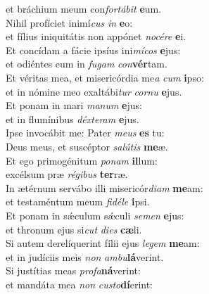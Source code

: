 \oddverse et bráchium meum con\textit{for}\textit{tá}\textit{bit} \textbf{e}um.\\
\evenverse Nihil profíciet inimí\textit{cus} \textit{in} \textbf{e}o:~\*\\
\evenverse et fílius iniquitátis non appónet \textit{no}\textit{cé}\textit{re} \textbf{e}i.\\
\oddverse Et concídam a fácie ipsíus ini\textit{mí}\textit{cos} \textbf{e}jus:~\*\\
\oddverse et odiéntes eum in \textit{fu}\textit{gam} \textit{con}\textbf{vér}tam.\\
\evenverse Et véritas mea, et misericórdia me\textit{a} \textit{cum} \textbf{i}pso:~\*\\
\evenverse et in nómine meo exaltábi\textit{tur} \textit{cor}\textit{nu} \textbf{e}jus.\\
\oddverse Et ponam in mari \textit{ma}\textit{num} \textbf{e}jus:~\*\\
\oddverse et in flumínibus \textit{déx}\textit{te}\textit{ram} \textbf{e}jus.\\
\evenverse Ipse invocábit me: Pater \textit{me}\textit{us} \textbf{es} tu:~\*\\
\evenverse Deus meus, et suscéptor \textit{sa}\textit{lú}\textit{tis} \textbf{me}æ.\\
\oddverse Et ego primogénitum \textit{po}\textit{nam} \textbf{il}lum:~\*\\
\oddverse excélsum præ \textit{ré}\textit{gi}\textit{bus} \textbf{ter}ræ.\\
\evenverse In ætérnum servábo illi misericór\textit{di}\textit{am} \textbf{me}am:~\*\\
\evenverse et testaméntum meum \textit{fi}\textit{dé}\textit{le} \textbf{i}psi.\\
\oddverse Et ponam in sǽculum sǽculi \textit{se}\textit{men} \textbf{e}jus:~\*\\
\oddverse et thronum ejus si\textit{cut} \textit{di}\textit{es} \textbf{cæ}li.\\
\evenverse Si autem derelíquerint fílii ejus \textit{le}\textit{gem} \textbf{me}am:~\*\\
\evenverse et in judíciis meis \textit{non} \textit{am}\textit{bu}\textbf{lá}verint.\\
\oddverse Si justítias meas \textit{pro}\textit{fa}\textbf{ná}verint:~\*\\
\oddverse et mandáta mea \textit{non} \textit{cu}\textit{sto}\textbf{dí}erint:\\
